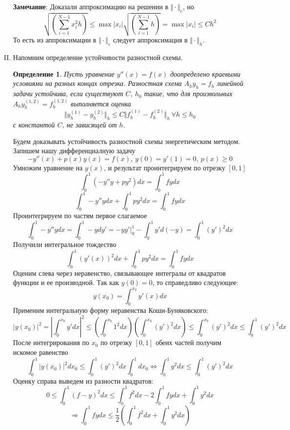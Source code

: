 \documentclass[12pt]{article}
\newtheorem*{definition}{Определение}
\begin{document}
\begin{enumerate}[I.]
	      \textbf{Замечание}: Доказали аппроксимацию на решении в $\Vert\cdot\Vert_e$, но
	      \[\sqrt{\left(\sum_{i=1}^{N-1}x_i^2h\right)}\leq\max|x_i|\sqrt{\left(\sum_{i=1}^{N-1}h\right)}=\max|x_i|\leq C h^2\]
	      То есть из аппроксимации в $\Vert\cdot\Vert_e$ следует аппроксимация в $\Vert\cdot\Vert_h$.

	      \newpage

	\item Напомним определение устойчивости разностной схемы.
	      \begin{definition}
		      Пусть уравнение $y''(x)=f(x)$ доопределено краевыми
		      условиями на разных концах отрезка. Разностная схема
		      $A_hy_h = f_h$ линейной задачи устойчива, если существуют $C$, $h_0$ такие, что для
		      произвольных $A_hy^{(1,2)}_h = f^{(1,2)}_h$ выполняется оценка
		      \[\Vert y^{(1)}_h-y^{(2)}_h\Vert_h\leq C\Vert f^{(1)}_h -f^{(2)}_h\Vert_h\ \forall h\leq h_0\]
		      с константой $C$, не зависящей от $h$.
	      \end{definition}

	      Будем доказывать устойчивость разностной схемы энергетическим методом.
	      Запишем нашу дифференциалную задачу
	      \[-y''(x)+p(x)y(x)=f(x),\ y(0) = y'(1) = 0,\ p(x)\geq 0\]
	      Умножим уравнение на $y(x)$, и результат проинтегрируем по отрезку $[0, 1]$
	      \[\int_0^1 (-y''y+py^2)dx = \int_0^1fydx \]
	      \[\int_0^1 -y''ydx+ \int_0^1py^2 dx = \int_0^1fydx \]
	      Проинтегрируем по частям первое слагаемое
	      \[\int_0^1 -y''ydx = \int_0^1-ydy' = -yy'\vert^1_0 - \int_0^1y'd(-y) = \int_0^1(y')^2dx\]
	      Получили интегральное тождество
	      \[\int_0^1 (y'(x))^2dx+ \int_0^1py^2 dx = \int_0^1fydx \]
	      Оценим слева через неравенство, связывающее интегралы от квадратов
	      функции и ее производной. Так как $y(0) = 0$, то справедливо следующее:
	      \[y(x_0) = \int_0^{x_0}y'(x)dx\]
	      Применим интегральную форму неравенства Коши-Буняковского:
	      \[|y(x_0)|^2 = \left|\int_0^{x_0}y'dx\right|^2\leq\left(\int_0^{x_0}1^2dx\right)\left(\int_0^{x_0}(y')^2dx\right)\leq\int_0^{x_0}(y')^2dx\leq\int_0^{1}(y')^2dx\]
	      После интегрирования по $x_0$ по отрезку $[0,1]$ обеих частей получим искомое равенство
	      \[\int_0^1|y(x_0)|^2dx_0 \leq \int_0^{1}(y')^2dx\int_0^1dx_0 \Leftrightarrow \int_0^1y^2dx\leq\int_0^1(y')^2dx\]
	      Оценку справа выведем из разности квадратов:
	      \[0\leq\int_0^1(f - y)^2dx\leq\int_0^1f^2dx-2\int_0^1fydx+\int_0^1y^2dx\]
	      \[\Rightarrow\int_0^1fydx\leq\frac{1}{2}\left(\int_0^1f^2dx + \int_0^1y^2dx\right)\]


\end{enumerate}
\end{document}

